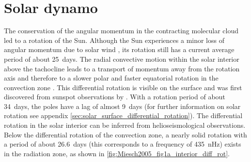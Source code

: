 \section{Solar dynamo}
\label{sec:solar_dynamo}
The conservation of the angular momentum in the contracting molecular cloud led to a rotation of the Sun. Although the Sun experiences a minor loss of angular momentum due to solar wind \citep{Weber1967}, its rotation still has a current average period of about 25~days. The radial convective motion within the solar interior above the tachocline leads to a transport of momentum away from the rotation axis and therefore to a slower polar and faster equatorial rotation in the convection zone \citep{Miesch2005}. This differential rotation is visible on the surface and was first discovered from sunspot observations by \citet{Scheiner1630}. With a rotation period of about 34~days, the poles have a lag of almost 9~days (for further information on solar rotation see appendix \autoref{sec:solar_surface_differential_rotation}). The differential rotation in the solar interior can be inferred from helioseismological observations. Below the differential rotation of the convection zone, a nearly solid rotation with a period of about \SI{26.6}{days} (this corresponds to a frequency of \SI{435}{\nano\hertz}) exists in the radiation zone, as shown in \autoref{fig:Miesch2005_fig1a_interior_diff_rot}.
